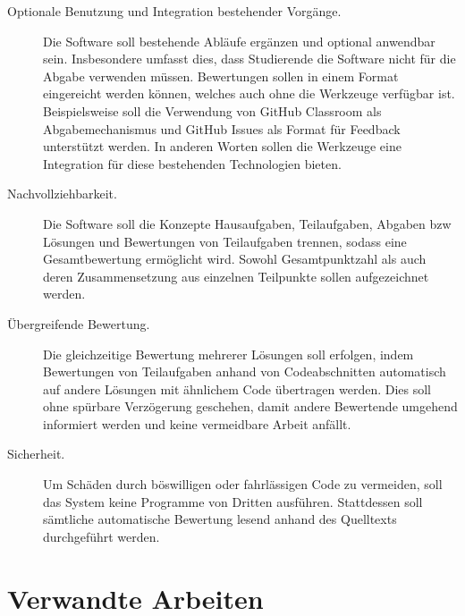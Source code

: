 \begin{description}
    \item[Optionale Benutzung und Integration bestehender Vorgänge.]
    Die Software soll bestehende Abläufe ergänzen und optional anwendbar sein.
    Insbesondere umfasst dies, dass Studierende die Software nicht für die Abgabe verwenden müssen.
    Bewertungen sollen in einem Format eingereicht werden können, welches auch ohne die Werkzeuge verfügbar ist.
    Beispielsweise soll die Verwendung von GitHub Classroom als Abgabemechanismus und GitHub Issues als Format für Feedback unterstützt werden.
    In anderen Worten sollen die Werkzeuge eine Integration für diese bestehenden Technologien bieten.
    \item[Nachvollziehbarkeit.]
    Die Software soll die Konzepte Hausaufgaben, Teilaufgaben, Abgaben \ac{bzw} Lösungen und Bewertungen von Teilaufgaben trennen, sodass eine Gesamtbewertung ermöglicht wird.
    Sowohl Gesamtpunktzahl als auch deren Zusammensetzung aus einzelnen Teilpunkte sollen aufgezeichnet werden.
    \item[Übergreifende Bewertung.]
    Die gleichzeitige Bewertung mehrerer Lösungen soll erfolgen, indem Bewertungen von Teilaufgaben anhand von Codeabschnitten automatisch auf andere Lösungen mit ähnlichem Code übertragen werden.
    Dies soll ohne spürbare Verzögerung geschehen, damit andere Bewertende umgehend informiert werden und keine vermeidbare Arbeit anfällt.
    \item[Sicherheit.]
    Um Schäden durch böswilligen oder fahrlässigen Code zu vermeiden, soll das System keine Programme von Dritten ausführen.
    Stattdessen soll sämtliche automatische Bewertung lesend anhand des Quelltexts durchgeführt werden.
\end{description}

\section{Verwandte Arbeiten}\label{sec:related-work}

